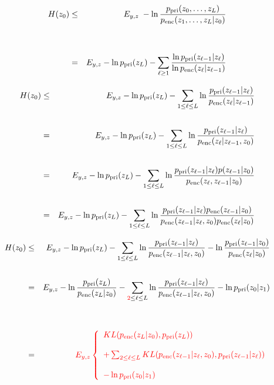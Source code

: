 {{\huge
\begin{eqnarray*}
H(z_0) & \leq & E_{y,z}\; -\ln \frac{p_{\mathrm{pri}}(z_0,\ldots,z_L)}{p_{\mathrm{enc}}(z_1,\ldots,z_L|z_0)}
\\
\\
\\
& = & E_{y,z} -\ln p_{\mathrm{pri}}(z_L) - \sum_{\ell \geq 1} \frac{\ln p_{\mathrm{pri}}(z_{\ell-1}|z_\ell)}{\ln p_{\mathrm{enc}}(z_\ell|z_{\ell-1})}
\end{eqnarray*}
}



{\huge
\begin{eqnarray*}
H(z_0) & \leq & E_{y,z} -\ln p_{\mathrm{pri}}(z_L) - \sum_{1 \leq \ell \leq L } \ln \frac{p_{\mathrm{pri}}(z_{\ell-1}|z_\ell)}{p_{\mathrm{enc}}(z_\ell|z_{\ell-1})} \\
\\
& = & E_{y,z} -\ln p_{\mathrm{pri}}(z_L) - \sum_{1 \leq \ell\leq L } \ln \frac{p_{\mathrm{pri}}(z_{\ell-1}|z_\ell)}{p_{\mathrm{enc}}(z_\ell|z_{\ell-1},z_0)} \\
\\
& = & E_{y,z} -\ln p_{\mathrm{pri}}(z_L) - \sum_{1 \leq \ell\leq L } \ln \frac{p_{\mathrm{pri}}(z_{\ell-1}|z_\ell)p(z_{\ell-1}|z_0)}{p_{\mathrm{enc}}(z_\ell,z_{\ell-1}|z_0)} \\
\\
& = & E_{y,z} -\ln p_{\mathrm{pri}}(z_L) - \sum_{1 \leq \ell\leq L } \ln \frac{p_{\mathrm{pri}}(z_{\ell-1}|z_\ell)p_{\mathrm{enc}}(z_{\ell-1}|z_0)}{p_{\mathrm{enc}}(z_{\ell-1}|z_\ell,z_0)p_{\mathrm{enc}}(z_\ell|z_0)}
\end{eqnarray*}
}


{\huge
\begin{eqnarray*}
H(z_0) & \leq & E_{y,z} -\ln p_{\mathrm{pri}}(z_L) - \sum_{1 \leq \ell\leq L } \ln \frac{p_{\mathrm{pri}}(z_{\ell-1}|z_\ell)}{p_{\mathrm{enc}}(z_{\ell-1}|z_\ell,z_0)}
- \ln \frac{p_{\mathrm{pri}}(z_{\ell-1}|z_0)}{p_{\mathrm{enc}}(z_\ell|z_0)} \\
\\
& = & E_{y,z} -\ln \frac{p_{\mathrm{pri}}(z_L)}{p_{\mathrm{enc}}(z_L|z_0)} - \sum_{{\color{red} 2} \leq \ell \leq L} \ln \frac{p_{\mathrm{pri}}(z_{\ell-1}|z_\ell)}{p_{\mathrm{enc}}(z_{\ell-1}|z_\ell,z_0)} - \ln p_{\mathrm{pri}}(z_0|z_1) \\
\\
\\
& = & {\color{red} E_{y,z} \left\{\begin{array}{l}KL(p_{\mathrm{enc}}(z_L|z_0),p_{\mathrm{pri}}(z_L)) \\
\\
+ \sum_{2 \leq \ell \leq L} KL(p_{\mathrm{enc}}(z_{\ell-1}|z_\ell,z_0),p_{\mathrm{pri}}(z_{\ell-1}|z_\ell)) \\
\\
- \ln p_{\mathrm{pri}}(z_0|z_1) \end{array} \right.}
\end{eqnarray*}
}

}
